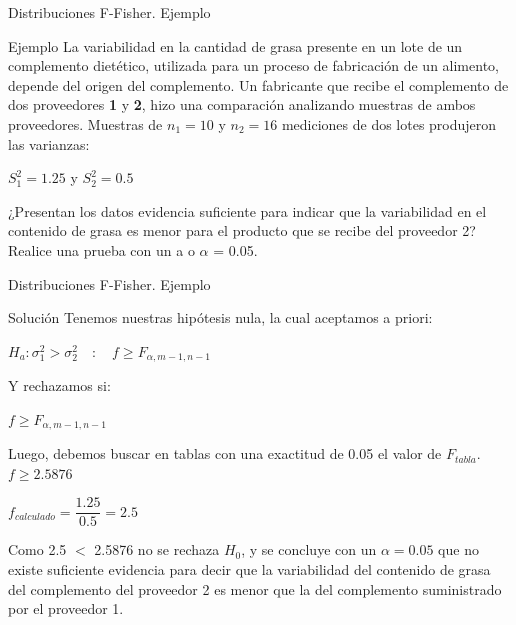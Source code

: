 \documentclass[11pt]{beamer}
\begin{document}
         \begin{frame}{Distribuciones F-Fisher. Ejemplo}
           \begin{block}{Ejemplo}
             La variabilidad en la cantidad de grasa presente en un lote de un complemento dietético, utilizada para un proceso de fabricación de un alimento, depende del origen del complemento. Un fabricante que recibe el complemento de dos proveedores \textbf{1} y \textbf{2}, hizo una comparación analizando muestras de ambos proveedores. Muestras de $n_1=10$ y $n_2=16$ mediciones de dos lotes produjeron las varianzas:

             $S^2_1=1.25$ y $S^2_2=0.5$

             ¿Presentan los datos evidencia suficiente para indicar que la variabilidad en el contenido de grasa es menor para el producto que se recibe del proveedor 2? Realice una prueba con un a o $\alpha$ = 0.05.
         \end{block}
        \end{frame}
         \begin{frame}{Distribuciones F-Fisher. Ejemplo}
           \begin{block}{Soluci\'on}
             Tenemos nuestras hipótesis nula, la cual aceptamos a priori:

             $H_a: \sigma^2_1 > \sigma^2_2\quad : \quad f \geq F_{\alpha,m-1,n-1}$

             Y rechazamos si:

             $f \geq F_{\alpha,m-1,n-1}$

             Luego, debemos buscar en tablas con una exactitud de 0.05 el valor de $F_{tabla}$.
             \pause
             $f \geq 2.5876$

             $f_{calculado} = \dfrac{1.25}{0.5}=2.5$
             \pause
             \vspace{0.2px}

             Como 2.5 $<$ 2.5876 no se rechaza $H_0$, y se concluye con un $\alpha= 0.05$ que no existe suficiente evidencia para decir que la variabilidad del contenido de grasa del complemento del proveedor 2 es menor que la del complemento suministrado por el proveedor 1.
           \end{block}
        \end{frame}
\end{document}
